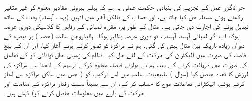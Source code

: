  حر ناگزر عمل کے تجزیے  کی بنیادی حکمت عملی یہ  ہے کہ پہلے بیرونی  مقادیر معلوم کو غیر متغیر رکھتے ہوئے مسئلہ حل کیا جاتا ہے،  اور حساب کے بالکل آخر میں انہیں  (بہت آہستہ)   وقت کے ساتھ تبدیل ہونے کی اجازت دی جاتی ہے۔ مثال کے طور پر، مقررہ لمبائی  کے   رقاص  کا کلاسیکی دوری عرصہ  ہوگا؛  اب اگر لمبائی آہستہ آہستہ  ،  تو دوری عرصہ  بظاہر   ہوگا۔    ہائیڈروجن سالمہ  (حصہ ) پر تبصرہ کے دوران زیادہ باریک بین مثال پیش کی گئی۔ ہم نے  مراکزہ کو  تصور کرتے ہوئے آغاز  کیا،   اور  ان کے بیچ فاصلہ  کی صورت میں الیکٹران کی حرکت کے لئے حل کیا۔  نظام کی زمینی حال توانائی کو  کے تفاعل کی صورت میں دریافت کرنے کے بعد،  ہم نے توازنی فاصلہ معلوم کرکے ترسیم کے  انحنا سے مراکزہ کی لرزش کا تعدد حاصل کیا (سوال )۔طبیعیات سالمہ میں اس ترکیب کو ( جس میں ساکن مراکزہ سے آغاز کرتے ہوئے،  الیکٹرانی تفاعلات موج کا حساب کر کے،  ان سے نسبتاً سست رفتار مراکزہ کے مقامات اور حرکت کے بارے میں معلومات حاصل کرنے کو)     کہتے ہیں۔
 
